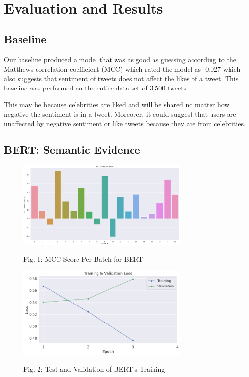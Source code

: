 \documentclass{article}
\begin{document}
\section{Evaluation and Results}
\label{sec:evaluation}
\subsection{Baseline}
Our baseline produced a model that was as good as guessing according to the Matthews correlation coefficient (MCC) which rated the model as -0.027 which also suggests that sentiment of tweets does not affect the likes of a tweet. 
This baseline was performed on the entire data set of 3,500 tweets. 

This may be because celebrities are liked and will be shared no matter how negative the sentiment is in a tweet. 
Moreover, it could suggest that users are unaffected by negative sentiment or like tweets because they are from celebrities. 

\subsection{BERT: Semantic Evidence}
\begin{figure}[htb]

\begin{minipage}[b]{1.0\linewidth}
  \centering
  \centerline{\includegraphics[width=8.5cm]{mcc.png}}
  \centerline{Fig. 1: MCC Score Per Batch for BERT}\medskip
\end{minipage}
%



\begin{minipage}[b]{1.0\linewidth}
  \centering
  \centerline{\includegraphics[width=8.5cm]{testvalid.png}}
  \centerline{Fig. 2: Test and Validation of BERT's Training}\medskip
\end{minipage}
\hfill

\end{figure}
\end{document}
